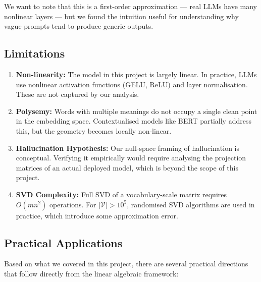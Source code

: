 \documentclass[12pt,a4paper]{article}
\begin{document}
We want to note that this is a first-order approximation --- real LLMs have many nonlinear
layers --- but we found the intuition useful for understanding why vague prompts tend to
produce generic outputs.

\subsection{Limitations}

\begin{enumerate}[label=\arabic*., itemsep=6pt]
    \item \textbf{Non-linearity:} The model in this project is largely linear. In practice,
          LLMs use nonlinear activation functions (GELU, ReLU) and layer normalisation. These
          are not captured by our analysis.

    \item \textbf{Polysemy:} Words with multiple meanings do not occupy a single clean
          point in the embedding space. Contextualised models like BERT partially address
          this, but the geometry becomes locally non-linear.

    \item \textbf{Hallucination Hypothesis:} Our null-space framing of hallucination is
          conceptual. Verifying it empirically would require analysing the projection
          matrices of an actual deployed model, which is beyond the scope of this project.

    \item \textbf{SVD Complexity:} Full SVD of a vocabulary-scale matrix requires
          $O(mn^2)$ operations. For $|\mathcal{V}| > 10^5$, randomised SVD algorithms
          are used in practice, which introduce some approximation error.
\end{enumerate}

\subsection{Practical Applications}

Based on what we covered in this project, there are several practical directions that
follow directly from the linear algebraic framework:
\end{document}
